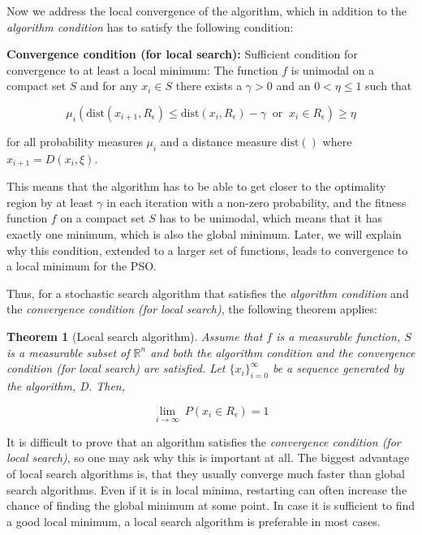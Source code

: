 \documentclass[
  oneside, a4paper, 12pt, openany]{book}
\newtheorem{theorem}{Theorem}[chapter]
\theoremstyle{definition}
\theoremstyle{definition}
\theoremstyle{definition}
\theoremstyle{definition}
\theoremstyle{remark}
\begin{document}
Now we address the local convergence of the algorithm, which in addition to the \emph{algorithm condition} has to satisfy the following condition:

\textbf{Convergence condition (for local search):} Sufficient condition for convergence to at least a local minimum: The function \(f\) is unimodal on a compact set \(S\) and for any \(x_i\in S\) there exists a \(\gamma > 0\) and an \(0<\eta\leq1\) such that

\[
  \mu_i(\text{dist}(x_{i+1}, R_{\epsilon}) \leq \text{dist}(x_{i}, R_{\epsilon})-\gamma \ \text{  or  } \  x_i \in R_{\epsilon} ) \geq \eta
\]

for all probability measures \(\mu_i\) and a distance measure \(\text{dist}()\) where \(x_{i+1} = D(x_i,\xi)\).

This means that the algorithm has to be able to get closer to the optimality region by at least \(\gamma\) in each iteration with a non-zero probability, and the fitness function \(f\) on a compact set \(S\) has to be unimodal, which means that it has exactly one minimum, which is also the global minimum. Later, we will explain why this condition, extended to a larger set of functions, leads to convergence to a local minimum for the PSO.

Thus, for a stochastic search algorithm that satisfies the \emph{algorithm condition} and the \emph{convergence condition (for local search)}, the following theorem applies:

\begin{theorem}[Local search algorithm]
Assume that \(f\) is a measurable function, \(S\) is a measurable subset of \(\mathbb{R}^n\) and both the algorithm condition and the convergence condition (for local search) are satisfied. Let \(\{x_i\}^{\infty}_{i=0}\) be a sequence generated by the algorithm, D. Then,

\[
  \lim_{i\rightarrow \infty} \ P(x_i \in R_{\epsilon}) = 1
\]
\end{theorem}

It is difficult to prove that an algorithm satisfies the \emph{convergence condition (for local search)}, so one may ask why this is important at all. The biggest advantage of local search algorithms is, that they usually converge much faster than global search algorithms. Even if it is in local minima, restarting can often increase the chance of finding the global minimum at some point. In case it is sufficient to find a good local minimum, a local search algorithm is preferable in most cases.
\end{document}

